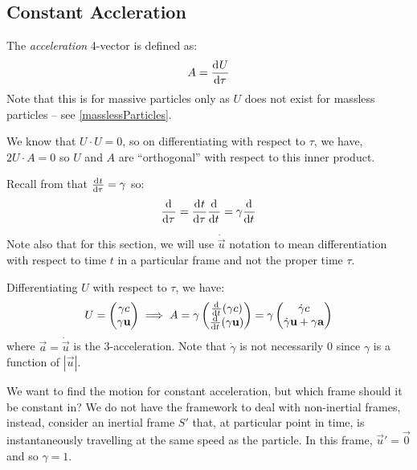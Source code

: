 \documentclass[../main.tex]{subfiles}
\begin{document}
\subsection{Constant Accleration}
\begin{definition}
  The \textit{acceleration} 4-vector is defined as:
  \[
    A = \deriv{U}{\tau}
  \]
  Note that this is for massive particles only as $U$ does not exist for massless particles -- see \cref{masslessParticles}.
\end{definition}
We know that $U \cdot U = 0$, so on differentiating with respect to $\tau$, we have, $2 U \cdot A = 0$ so $U$ and $A$ are ``orthogonal'' with respect to this inner product.
\begin{remark}[Recap]
  Recall from that $\deriv{t}{\tau} = \gamma$ so:
  \[
    \deriv{}{\tau} = \deriv{t}{\tau} \deriv{}{t} = \gamma \deriv{}{t}
  \]

  Note also that for this section, we will use $\dot{\vec{u}}$ notation to mean differentiation with respect to time $t$ in a particular frame and not the proper time $\tau$.
\end{remark}
Differentiating $U$ with respect to $\tau$, we have:
\begin{equation}
  U = \begin{pmatrix}
  \gamma c \\
  \gamma \vec{u} \\
  \end{pmatrix} \implies A = \gamma \begin{pmatrix}
  \deriv{}{t}(\gamma c) \\
  \deriv{}{t}(\gamma \vec{u}) \\
  \end{pmatrix} = \gamma \begin{pmatrix}
  \dot{\gamma} c \\
  \dot{\gamma} \vec{u} + \gamma \vec{a} \\
  \end{pmatrix} \label{general4-Accel}
\end{equation}
where $\vec{a} = \dot{\vec{u}}$ is the 3-acceleration.
Note that $\dot{\gamma}$ is not necessarily 0 since $\gamma$ is a function of $|\vec{u}|$.

We want to find the motion for constant acceleration, but which frame should it be constant in?
We do not have the framework to deal with non-inertial frames, instead, consider an inertial frame $S'$ that, at particular point in time, is instantaneously travelling at the same speed as the particle.
In this frame, $\vec{u}' = \vec{0}$ and so $\gamma = 1$.
\end{document}
